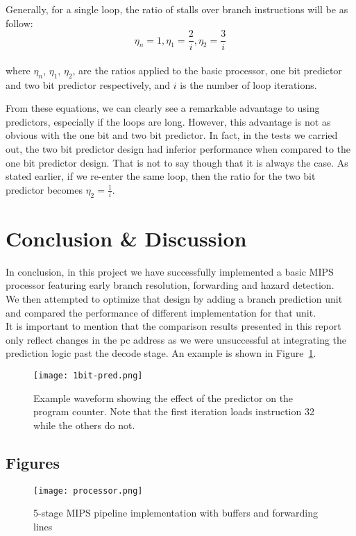 \documentclass[12pt]{IEEEtran} %
\begin{document}
Generally, for a single loop, the ratio of stalls over branch instructions will be as follow:
$$\eta_n = 1, \eta_1 = \frac{2}{i}, \eta_2 = \frac{3}{i}$$\\
where $\eta_n$, $\eta_1$, $\eta_2$, are the ratios applied to the basic processor, one bit predictor and two bit predictor respectively, and $i$ is the number of loop iterations.

From these equations, we can clearly see a remarkable advantage to using predictors, especially if the loops are long. However, this advantage is not as obvious with the one bit and two bit predictor. In fact, in the tests we carried out, the two bit predictor design had inferior performance when compared to the one bit predictor design. That is not to say though that it is always the case. As stated earlier, if we re-enter the same loop, then the ratio for the two bit predictor becomes $\eta_2 = \frac{1}{i}$.


\section{Conclusion \& Discussion}
In conclusion, in this project we have successfully implemented a basic MIPS processor featuring early branch resolution, forwarding and hazard detection. \\
We then attempted to optimize that design by adding a branch prediction unit and compared the performance of different implementation for that unit.  \\
It is important to mention that the comparison results presented in this report only reflect changes in the pc address as we were unsuccessful at integrating the prediction logic past the decode stage. An example is shown in Figure~\ref{fig:pred}.

\begin{figure}[!htb]
    \centering
    \texttt{[image: 1bit-pred.png]}
    \caption{Example waveform showing the effect of the predictor on the program counter. Note that the first iteration loads instruction 32 while the others do not.}
    \label{fig:pred}
\end{figure}



\begin{landscape}
\begin{@twocolumnfalse}
\section*{Figures}
\begin{figure}[!htb]
    \centering
    \texttt{[image: processor.png]}
    \caption{5-stage MIPS pipeline implementation with buffers and forwarding lines }
    \label{fig:figure1}
\end{figure}
\end{@twocolumnfalse}
\end{landscape}
\end{document}
